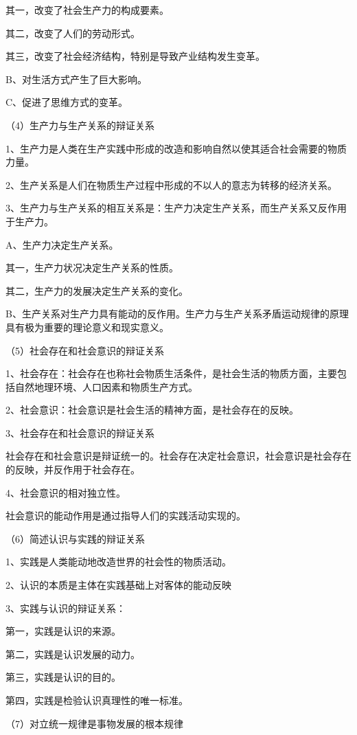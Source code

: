 \documentclass[lang=cn,10pt]{elegantbook}
\begin{document}
	其一，改变了社会生产力的构成要素。
	
	其二，改变了人们的劳动形式。
	
	其三，改变了社会经济结构，特别是导致产业结构发生变革。
	
	B、对生活方式产生了巨大影响。
	
	C、促进了思维方式的变革。
	
	（4）生产力与生产关系的辩证关系
	
	1、生产力是人类在生产实践中形成的改造和影响自然以使其适合社会需要的物质力量。
	
	2、生产关系是人们在物质生产过程中形成的不以人的意志为转移的经济关系。
	
	3、生产力与生产关系的相互关系是：生产力决定生产关系，而生产关系又反作用于生产力。

	A、生产力决定生产关系。

	其一，生产力状况决定生产关系的性质。
	
	其二，生产力的发展决定生产关系的变化。
	
	B、生产关系对生产力具有能动的反作用。生产力与生产关系矛盾运动规律的原理具有极为重要的理论意义和现实意义。
	
	（5）社会存在和社会意识的辩证关系
	
	1、社会存在：社会存在也称社会物质生活条件，是社会生活的物质方面，主要包括自然地理环境、人口因素和物质生产方式。
	
	2、社会意识：社会意识是社会生活的精神方面，是社会存在的反映。
	
	
	3、社会存在和社会意识的辩证关系
	
	社会存在和社会意识是辩证统一的。社会存在决定社会意识，社会意识是社会存在的反映，并反作用于社会存在。
	
	4、社会意识的相对独立性。
	
	社会意识的能动作用是通过指导人们的实践活动实现的。
	
	（6）简述认识与实践的辩证关系
	
	1、实践是人类能动地改造世界的社会性的物质活动。
	
	2、认识的本质是主体在实践基础上对客体的能动反映
	
	3、实践与认识的辩证关系：
	
	第一，实践是认识的来源。
	
	第二，实践是认识发展的动力。
	
	第三，实践是认识的目的。
	
	第四，实践是检验认识真理性的唯一标准。
	
	（7）对立统一规律是事物发展的根本规律
	
\end{document}
